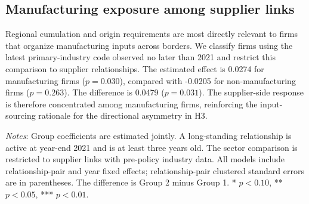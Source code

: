 \documentclass[preprint,12pt,authoryear]{elsarticle}
\begin{document}
\subsection{Manufacturing exposure among supplier links}

Regional cumulation and origin requirements are most directly relevant to firms that organize manufacturing inputs across borders. We classify firms using the latest primary-industry code observed no later than 2021 and restrict this comparison to supplier relationships. The estimated effect is 0.0274 for manufacturing firms ($p=0.030$), compared with -0.0205 for non-manufacturing firms ($p=0.263$). The difference is 0.0479 ($p=0.031$). The supplier-side response is therefore concentrated among manufacturing firms, reinforcing the input-sourcing rationale for the directional asymmetry in H3.

\begin{table}[H]
\centering
\caption{Heterogeneity analysis}
\label{tab:heterogeneity}
\small
\begin{minipage}{\textwidth}
\centering
{}
\vspace{2pt}
\parbox{\textwidth}{\footnotesize \textit{Notes}: Group coefficients are estimated jointly. A long-standing relationship is active at year-end 2021 and is at least three years old. The sector comparison is restricted to supplier links with pre-policy industry data. All models include relationship-pair and year fixed effects; relationship-pair clustered standard errors are in parentheses. The difference is Group 2 minus Group 1. * $p<0.10$, ** $p<0.05$, *** $p<0.01$.}
\end{minipage}
\end{table}
 
\end{document}
